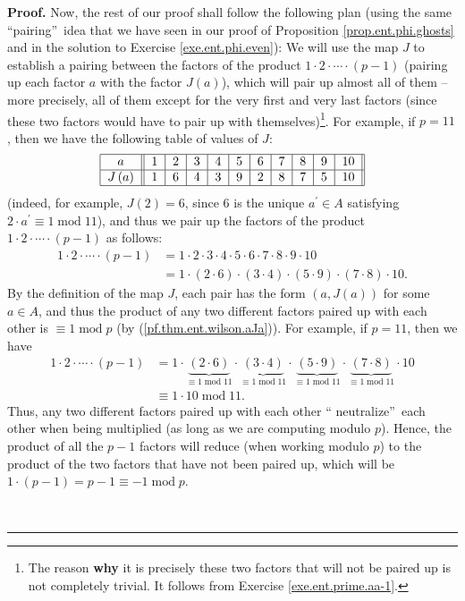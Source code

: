 \documentclass[numbers=enddot,12pt,final,onecolumn,notitlepage]{scrartcl}%
\numberwithin{exer}{subsection}
\theoremstyle{definition}
\newenvironment{proof}[1][Proof]{\noindent\textbf{#1.} }{\ \rule{0.5em}{0.5em}}
\begin{document}
\begin{proof}
Now, the rest of our proof shall follow the following plan (using the same
\textquotedblleft pairing\textquotedblright\ idea that we have seen in our
proof of Proposition \ref{prop.ent.phi.ghosts} and in the solution to Exercise
\ref{exe.ent.phi.even}): We will use the map $J$ to establish a pairing
between the factors of the product $1\cdot2\cdot\cdots\cdot\left(  p-1\right)
$ (pairing up each factor $a$ with the factor $J\left(  a\right)  $), which
will pair up almost all of them -- more precisely, all of them except for the
very first and very last factors (since these two factors would have to pair
up with themselves)\footnote{The reason \textbf{why} it is precisely these two
factors that will not be paired up is not completely trivial. It follows from
Exercise \ref{exe.ent.prime.aa-1}.}. For example, if $p=11$, then we have the
following table of values of $J$:%
\[%
\begin{tabular}
[c]{|c||c|c|c|c|c|c|c|c|c|c||}\hline
$a$ & $1$ & $2$ & $3$ & $4$ & $5$ & $6$ & $7$ & $8$ & $9$ & $10$\\\hline
$J\left(  a\right)  $ & $1$ & $6$ & $4$ & $3$ & $9$ & $2$ & $8$ & $7$ & $5$ &
$10$\\\hline
\end{tabular}
\]
(indeed, for example, $J\left(  2\right)  =6$, since $6$ is the unique
$a^{\prime}\in A$ satisfying $2\cdot a^{\prime}\equiv1\operatorname{mod}11$),
and thus we pair up the factors of the product $1\cdot2\cdot\cdots\cdot\left(
p-1\right)  $ as follows:%
\begin{align*}
1\cdot2\cdot\cdots\cdot\left(  p-1\right)   &  =1\cdot2\cdot3\cdot4\cdot
5\cdot6\cdot7\cdot8\cdot9\cdot10\\
&  =1\cdot\left(  2\cdot6\right)  \cdot\left(  3\cdot4\right)  \cdot\left(
5\cdot9\right)  \cdot\left(  7\cdot8\right)  \cdot10.
\end{align*}
By the definition of the map $J$, each pair has the form $\left(  a,J\left(
a\right)  \right)  $ for some $a\in A$, and thus the product of any two
different factors paired up with each other is $\equiv1\operatorname{mod}p$
(by (\ref{pf.thm.ent.wilson.aJa})). For example, if $p=11$, then we have%
\begin{align*}
1\cdot2\cdot\cdots\cdot\left(  p-1\right)   &  =1\cdot\underbrace{\left(
2\cdot6\right)  }_{\equiv1\operatorname{mod}11}\cdot\underbrace{\left(
3\cdot4\right)  }_{\equiv1\operatorname{mod}11}\cdot\underbrace{\left(
5\cdot9\right)  }_{\equiv1\operatorname{mod}11}\cdot\underbrace{\left(
7\cdot8\right)  }_{\equiv1\operatorname{mod}11}\cdot10\\
&  \equiv1\cdot10\operatorname{mod}11.
\end{align*}
Thus, any two different factors paired up with each other \textquotedblleft
neutralize\textquotedblright\ each other when being multiplied (as long as we
are computing modulo $p$). Hence, the product of all the $p-1$ factors will
reduce (when working modulo $p$) to the product of the two factors that have
not been paired up, which will be $1\cdot\left(  p-1\right)  =p-1\equiv
-1\operatorname{mod}p$.


\end{proof}
\end{document}
